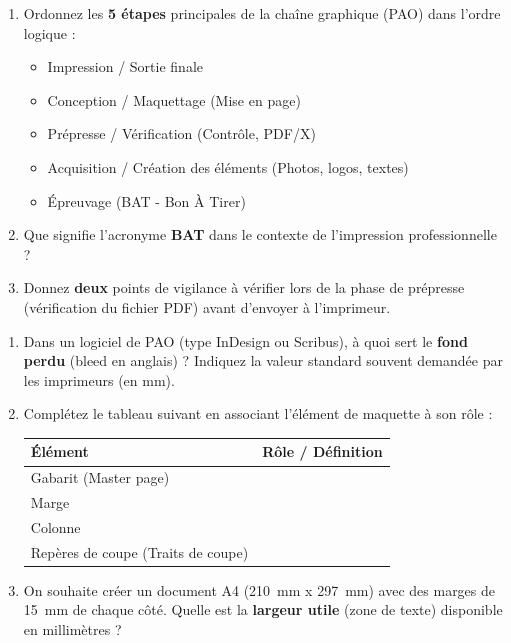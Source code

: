 \documentclass[11pt]{article}
\begin{document}
\begin{exercice}
\begin{enumerate}
    \item Ordonnez les \textbf{5 étapes} principales de la chaîne graphique (PAO) dans l'ordre logique :
    \begin{itemize}
        \item Impression / Sortie finale
        \item Conception / Maquettage (Mise en page)
        \item Prépresse / Vérification (Contrôle, PDF/X)
        \item Acquisition / Création des éléments (Photos, logos, textes)
        \item Épreuvage (BAT - Bon À Tirer)
    \end{itemize}
    \item Que signifie l'acronyme \textbf{BAT} dans le contexte de l'impression professionnelle ?
    \item Donnez \textbf{deux} points de vigilance à vérifier lors de la phase de prépresse (vérification du fichier PDF) avant d'envoyer à l'imprimeur.
\end{enumerate}
\end{exercice}

\begin{exercice}
\begin{enumerate}
    \item Dans un logiciel de PAO (type InDesign ou Scribus), à quoi sert le \textbf{fond perdu} (bleed en anglais) ? Indiquez la valeur standard souvent demandée par les imprimeurs (en mm).
    \item Complétez le tableau suivant en associant l'élément de maquette à son rôle :
    \begin{tabular}{|l|p{8cm}|}
    \hline
    \textbf{Élément} & \textbf{Rôle / Définition} \\ \hline
    Gabarit (Master page) & \\ \hline
    Marge & \\ \hline
    Colonne & \\ \hline
    Repères de coupe (Traits de coupe) & \\ \hline
    \end{tabular}
    \item On souhaite créer un document A4 (\SI{210}{mm} x \SI{297}{mm}) avec des marges de \SI{15}{mm} de chaque côté. Quelle est la \textbf{largeur utile} (zone de texte) disponible en millimètres ?
\end{enumerate}
\end{exercice}
\end{document}
